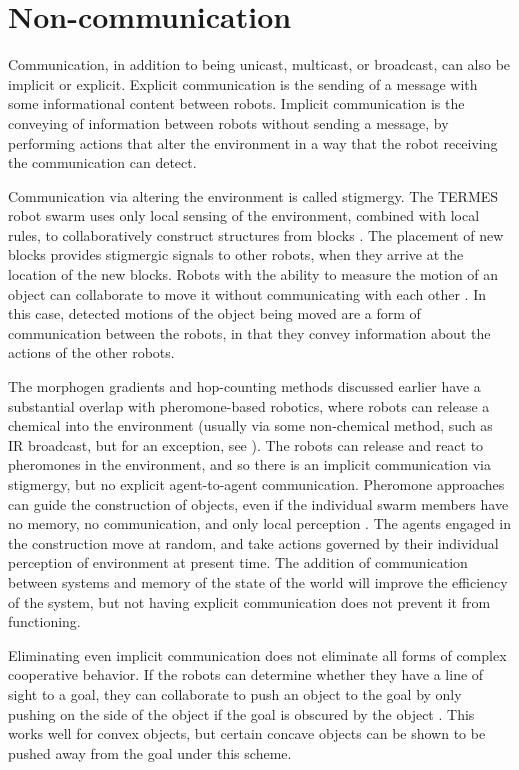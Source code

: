 \documentclass[]{article}
\begin{document}
\section{Non-communication}

Communication, in addition to being unicast, multicast, or broadcast, can also be implicit or explicit. 
Explicit communication is the sending of a message with some informational content between robots. 
Implicit communication is the conveying of information between robots without sending a message, by performing actions that alter the environment in a way that the robot receiving the communication can detect. 

Communication via altering the environment is called stigmergy.
The TERMES robot swarm uses only local sensing of the environment, combined with local rules, to collaboratively construct structures from blocks \cite{werfel2014designing}. 
The placement of new blocks provides stigmergic signals to other robots, when they arrive at the location of the new blocks. 
Robots with the ability to measure the motion of an object can collaborate to move it without communicating with each other \cite{wang2015multi}. 
In this case, detected motions of the object being moved are a form of communication between the robots, in that they convey information about the actions of the other robots. 

The morphogen gradients and hop-counting methods discussed earlier have a substantial overlap with pheromone-based robotics, where robots can release a chemical into the environment (usually via some non-chemical method, such as IR broadcast, but for an exception, see \cite{hayes2001swarm}). 
The robots can release and react to pheromones in the environment, and so there is an implicit communication via stigmergy, but no explicit agent-to-agent communication. 
Pheromone approaches can guide the construction of objects, even if the individual swarm members have no memory, no communication, and only local perception \cite{mason2003programming, wawerla2002collective, bowyer2000automated}.
The agents engaged in the construction move at random, and take actions governed by their individual perception of environment at present time. 
The addition of communication between systems and memory of the state of the world will improve the efficiency of the system, but not having explicit communication does not prevent it from functioning.

Eliminating even implicit communication does not eliminate all forms of complex cooperative behavior. 
If the robots can determine whether they have a line of sight to a goal, they can collaborate to push an object to the goal by only pushing on the side of the object if the goal is obscured by the object \cite{chen2015occlusion}. This works well for convex objects, but certain concave objects can be shown to be pushed away from the goal under this scheme. 
\end{document}
